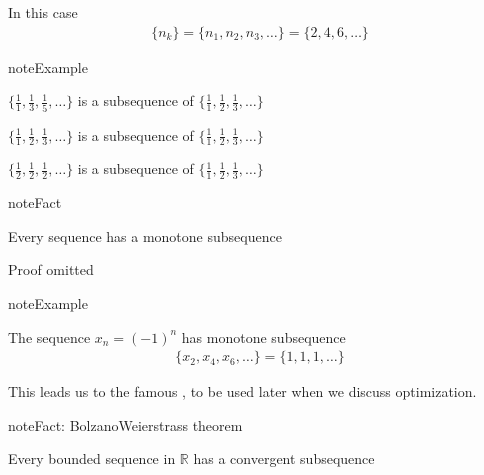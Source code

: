 \documentclass[letterpaper,10pt,english]{jupyterBook}
\begin{document}
\sphinxAtStartPar
In this case
\begin{equation*}
\begin{split}
\{n_k\} = \{n_1, n_2, n_3, \ldots\} = \{2, 4, 6, \ldots\}
\end{split}
\end{equation*}
\begin{sphinxadmonition}{note}{Example}

\sphinxAtStartPar
\(\{\frac{1}{1}, \frac{1}{3}, \frac{1}{5},\ldots\}\) is a
subsequence of \(\{\frac{1}{1}, \frac{1}{2}, \frac{1}{3}, \ldots\}\)

\sphinxAtStartPar
\(\{\frac{1}{1}, \frac{1}{2}, \frac{1}{3},\ldots\}\) is a
subsequence of \(\{\frac{1}{1}, \frac{1}{2}, \frac{1}{3}, \ldots\}\)

\sphinxAtStartPar
\(\{\frac{1}{2}, \frac{1}{2}, \frac{1}{2},\ldots\}\) is  a
subsequence of \(\{\frac{1}{1}, \frac{1}{2}, \frac{1}{3}, \ldots\}\)
\end{sphinxadmonition}

\begin{sphinxadmonition}{note}{Fact}

\sphinxAtStartPar
Every sequence has a monotone subsequence
\end{sphinxadmonition}

\sphinxAtStartPar
Proof omitted

\begin{sphinxadmonition}{note}{Example}

\sphinxAtStartPar
The sequence \(x_n = (-1)^n\) has monotone subsequence
\begin{equation*}
\begin{split}
\{x_2, x_4, x_6, \ldots \}
= \{1, 1, 1, \ldots \}
\end{split}
\end{equation*}\end{sphinxadmonition}

\sphinxAtStartPar
This leads us to the famous ,
to be used later when we discuss optimization.

\begin{sphinxadmonition}{note}{Fact: Bolzano\sphinxhyphen{}Weierstrass theorem}

\sphinxAtStartPar
Every bounded sequence in \(\mathbb{R}\) has a convergent subsequence
\end{sphinxadmonition}
\end{document}
